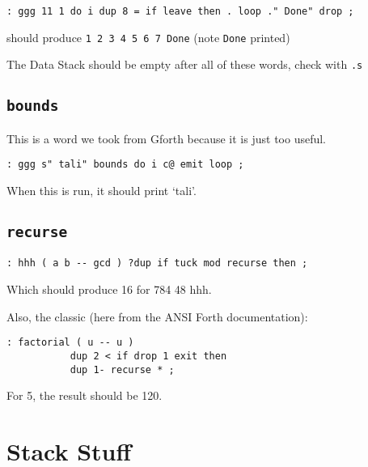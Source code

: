 \begin{lstlisting}[frame=lines]
        : ggg 11 1 do i dup 8 = if leave then . loop ." Done" drop ; 
\end{lstlisting}

\noindent should produce \texttt{1 2 3 4 5 6 7 Done} (note \texttt{Done} printed)

The Data Stack should be empty after all of these words, check with \texttt{.s}

\subsection{\texttt{bounds}} 

This is a word we took from Gforth because it is just too useful.

\begin{lstlisting}[frame=lines]
        : ggg s" tali" bounds do i c@ emit loop ;
\end{lstlisting}

\noindent When this is run, it should print `tali'.



\subsection{\texttt{recurse}}

\begin{lstlisting}[frame=lines]
        : hhh ( a b -- gcd ) ?dup if tuck mod recurse then ;
\end{lstlisting}

\noindent Which should produce 16 for 784 48 hhh. 


Also, the classic (here from the ANSI Forth documentation):

\begin{lstlisting}[frame=lines]
        : factorial ( u -- u ) 
           dup 2 < if drop 1 exit then 
           dup 1- recurse * ;
\end{lstlisting}

\noindent For 5, the result should be 120.


\section{Stack Stuff}

